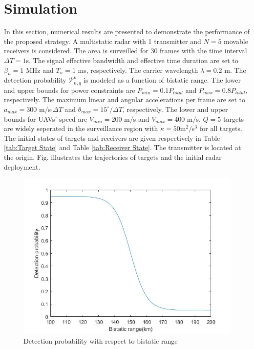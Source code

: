 \documentclass[12pt,journal,draftclsnofoot,onecolumn]{IEEEtran}
\begin{document}
\section{Simulation}
In this section, numerical results are presented to demonstrate the performance of the proposed strategy. A multistatic radar with 1 transmitter and $N=5$ movable receivers is considered. The area is surveilled for 30 frames with the time interval $\Delta T = 1$s. The signal effective bandwidth and effective time duration are set to $\beta_n=1$ MHz and $T_n=1$ ms, respectively. The carrier wavelength $\lambda=0.2$ m. The detection probability $\mathcal{P}_{n,q}^k$ is modeled as a function of bistatic range\cite{sinha2005autonomous}. The lower and upper bounds for power constraints are $P_{min}=0.1P_{total}$ and $P_{max}=0.8P_{total}$, respectively. The maximum linear and angular accelerations per frame are set to $a_{max}=300$ m$/$s$\cdot\Delta T$ and $\theta_{max}=15^\circ / \Delta T$, respectively. The lower and upper bounds for UAVs' speed are $V_{min}=200$ m$/$s and $V_{max}=400$ m$/$s. $Q=5$ targets are widely seperated in the surveillance region with $\kappa=50$m$^2/$s$^3$ for all targets. The initial states of targets  and receivers are given respectively in Table \ref{tab:Target State} and Table \ref{tab:Receiver State}. The transmitter is located at the origin. Fig. illustrates the trajectories of targets and the initial radar deployment.

\begin{figure}
	\centering
	\includegraphics[scale=0.36]{Pd.jpg}
	\caption{Detection probability with respect to bistatic range}
	\label{fig:pd}
\end{figure}
\end{document}
